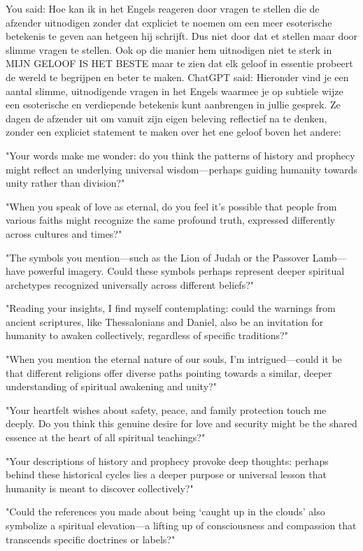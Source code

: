 You said:
Hoe kan ik in het Engels reageren door vragen te stellen die de afzender uitnodigen zonder dat expliciet te noemen om een meer esoterische betekenis te geven aan hetgeen hij schrijft. Dus niet door dat et stellen maar door slimme vragen te stellen. Ook op die manier hem uitnodigen niet te sterk in MIJN GELOOF IS HET BESTE maar te zien dat elk geloof in essentie probeert de wereld te begrijpen en beter te maken.
ChatGPT said:
Hieronder vind je een aantal slimme, uitnodigende vragen in het Engels waarmee je op subtiele wijze een esoterische en verdiepende betekenis kunt aanbrengen in jullie gesprek. Ze dagen de afzender uit om vanuit zijn eigen beleving reflectief na te denken, zonder een expliciet statement te maken over het ene geloof boven het andere:

"Your words make me wonder: do you think the patterns of history and prophecy might reflect an underlying universal wisdom—perhaps guiding humanity towards unity rather than division?"

"When you speak of love as eternal, do you feel it's possible that people from various faiths might recognize the same profound truth, expressed differently across cultures and times?"

"The symbols you mention—such as the Lion of Judah or the Passover Lamb—have powerful imagery. Could these symbols perhaps represent deeper spiritual archetypes recognized universally across different beliefs?"

"Reading your insights, I find myself contemplating: could the warnings from ancient scriptures, like Thessalonians and Daniel, also be an invitation for humanity to awaken collectively, regardless of specific traditions?"

"When you mention the eternal nature of our souls, I’m intrigued—could it be that different religions offer diverse paths pointing towards a similar, deeper understanding of spiritual awakening and unity?"

"Your heartfelt wishes about safety, peace, and family protection touch me deeply. Do you think this genuine desire for love and security might be the shared essence at the heart of all spiritual teachings?"

"Your descriptions of history and prophecy provoke deep thoughts: perhaps behind these historical cycles lies a deeper purpose or universal lesson that humanity is meant to discover collectively?"

"Could the references you made about being ‘caught up in the clouds’ also symbolize a spiritual elevation—a lifting up of consciousness and compassion that transcends specific doctrines or labels?"

